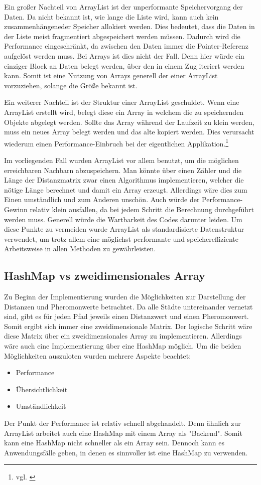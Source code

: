 Ein großer Nachteil von ArrayList ist der unperformante Speichervorgang der Daten. Da nicht bekannt ist, wie lange die Liste wird, kann auch kein zusammenhängeneder Speicher allokiert werden. Dies bedeutet, dass die Daten in der Liste meist fragmentiert abgespeichert werden müssen. Dadurch wird die Performance eingeschränkt, da zwischen den Daten immer die Pointer-Referenz aufgelöst werden muss. Bei Arrays ist dies nicht der Fall. Denn hier würde ein einziger Block an Daten belegt werden, über den in einem Zug iteriert werden kann. Somit ist eine Nutzung von Arrays generell der einer ArrayList vorzuziehen, solange die Größe bekannt ist. 

Ein weiterer Nachteil ist der Struktur einer ArrayList geschuldet. Wenn eine ArrayList erstellt wird, belegt diese ein Array in welchem die zu speichernden Objekte abgelegt werden. Sollte das Array während der Laufzeit zu klein werden, muss ein neues Array belegt werden und das alte kopiert werden. Dies verursacht wiederum einen Performance-Einbruch bei der eigentlichen Applikation.\footnote{vgl. \cite{Smyth2007}}

Im vorliegenden Fall wurden ArrayList vor allem benutzt, um die möglichen erreichbaren Nachbarn abzuspeichern. Man könnte über einen Zähler und die Länge der Distanzmatrix zwar einen Algorithmus implementieren, welcher die nötige Länge berechnet und damit ein Array erzeugt. Allerdings wäre dies zum Einen umständlich und zum Anderen unschön. Auch würde der Performance-Gewinn relativ klein ausfallen, da bei jedem Schritt die Berechnung durchgeführt werden muss. Generell würde die Wartbarkeit des Codes darunter leiden. Um diese Punkte zu vermeiden wurde ArrayList als standardisierte Datenstruktur verwendet, um trotz allem eine möglichst performante und speichereffiziente Arbeitsweise in allen Methoden zu gewährleisten.

\subsection{HashMap vs zweidimensionales Array}
Zu Beginn der Implementierung wurden die Möglichkeiten zur Darstellung der Distanzen und Pheromonwerte betrachtet. Da alle Städte untereinander vernetzt sind, gibt es für jeden Pfad jeweils einen Distanzwert und einen Pheromonwert. Somit ergibt sich immer eine zweidimensionale Matrix. Der logische Schritt wäre diese Matrix über ein zweidimensionales Array zu implementieren. Allerdings wäre auch eine Implementierung über eine HashMap möglich. Um die beiden Möglichkeiten auszuloten wurden mehrere Aspekte beachtet:
\begin{itemize}
	\item Performance
	\item Übersichtlichkeit
	\item Umständlichkeit
\end{itemize}
Der Punkt der Performance ist relativ schnell abgehandelt. Denn ähnlich zur ArrayList arbeitet auch eine HashMap mit einem Array als "Backend". Somit kann eine HashMap nicht schneller als ein Array sein. Dennoch kann es Anwendungsfälle geben, in denen es sinnvoller ist eine HashMap zu verwenden.

